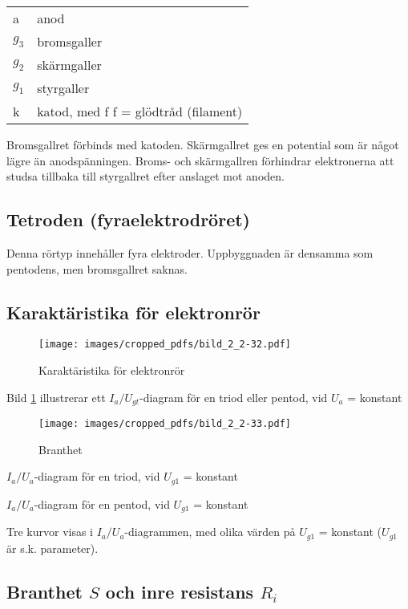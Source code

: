 \begin{tabular}{ll}
  a       & anod \\
  \(g_3\) & bromsgaller \\
  \(g_2\) & skärmgaller \\
  \(g_1\) & styrgaller \\
  k      & katod, med f f = glödtråd (filament) \\
\end{tabular}

Bromsgallret förbinds med katoden. Skärmgallret ges en potential som är något
lägre än anodspänningen. Broms- och skärmgallren förhindrar elektronerna att
studsa tillbaka till styrgallret efter anslaget mot anoden.


\subsection{Tetroden (fyraelektrodröret)}

Denna rörtyp innehåller fyra elektroder. Uppbyggnaden är densamma som pentodens,
men bromsgallret saknas.

\subsection{Karaktäristika för elektronrör}

\begin{figure}
\texttt{[image: images/cropped\_pdfs/bild\_2\_2-32.pdf]}
\caption{Karaktäristika för elektronrör}
\label{fig:BildII2-32}
\end{figure}

Bild \ref{fig:BildII2-32} illustrerar ett \(I_a/U_{gt}\)-diagram för en triod
eller pentod, vid \(U_a\) = konstant

\begin{wrapfigure}[20]{R}{0.5\textwidth}
\texttt{[image: images/cropped\_pdfs/bild\_2\_2-33.pdf]}
\caption{Branthet}
\label{fig:BildII2-33}
\end{wrapfigure}

\(I_a/U_a\)-diagram för en triod, vid \(U_{g1}\) = konstant

\(I_a/U_a\)-diagram för en pentod, vid \(U_{g1}\) = konstant

Tre kurvor visas i \(I_a/U_a\)-diagrammen, med olika värden på
\(U_{g1}\) = konstant (\(U_{g1}\) är s.k. parameter).

\subsection{Branthet $S$ och inre resistans $R_i$}

